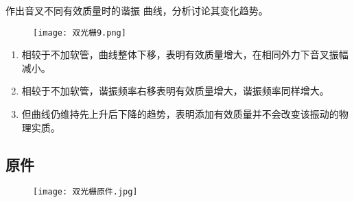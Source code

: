 \documentclass[dvipsnames, svgnames,a4paper,11pt]{article}
\begin{document}
\begin{question}
    作出音叉不同有效质量时的谐振 曲线，分析讨论其变化趋势。
    \tcblower
    \begin{figure}[H]
        \centering
        \texttt{[image: 双光栅9.png]}
    \end{figure}
    \begin{enumerate}
        \item 相较于不加软管，曲线整体下移，表明有效质量增大，在相同外力下音叉振幅减小。
        \item 相较于不加软管，谐振频率右移表明有效质量增大，谐振频率同样增大。
        \item 但曲线仍维持先上升后下降的趋势，表明添加有效质量并不会改变该振动的物理实质。
    \end{enumerate}
    
\end{question}
\clearpage
%
%


\clearpage
\appendix
\appendixpage
\addappheadtotoc
%
\subsection*{原件}
%
\begin{figure}[H]
	\centering
	\texttt{[image: 双光栅原件.jpg]}
	
\end{figure}
	
\end{document}
